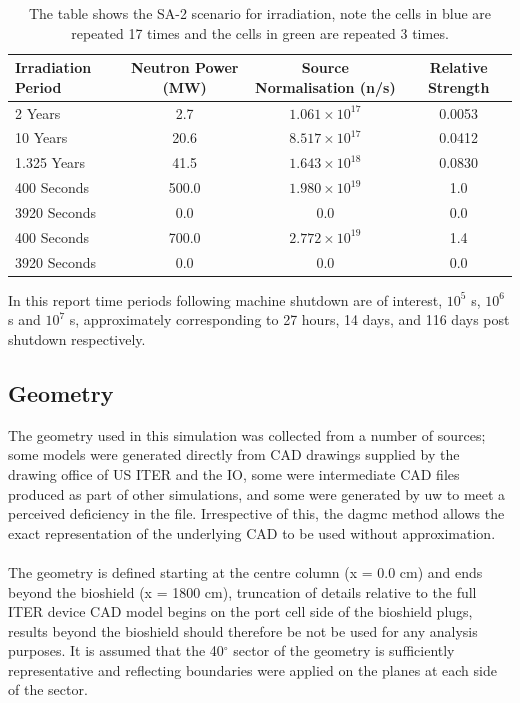 \documentclass[12pt]{article}
\begin{document}
\begin{table}[ht!]
   \begin{tabular}{| l | c | c | c |}
      \hline 
      Irradiation Period & Neutron Power (MW) & Source Normalisation (n/s) &  Relative Strength \\
      \hline
      2 Years & 2.7 & $1.061\times10^{17}$ & 0.0053 \\
      10 Years & 20.6 & $8.517\times10^{17}$ & 0.0412 \\
      1.325 Years & 41.5 & $1.643\times10^{18}$ & 0.0830 \\
      \cellcolor{blue!25} \cellcolor{blue!25} 400 Seconds & \cellcolor{blue!25} 500.0 & $1.980\times10^{19}$ & \cellcolor{blue!25} 1.0  \\
      \cellcolor{blue!25} 3920 Seconds & \cellcolor{blue!25} 0.0 & \cellcolor{blue!25} 0.0 & \cellcolor{blue!25} 0.0 \\
      \cellcolor{green!25} 400 Seconds & \cellcolor{green!25} 700.0 & \cellcolor{green!25} $2.772\times10^{19}$ &\cellcolor{green!25} 1.4 \\
      \cellcolor{green!25} 3920 Seconds & \cellcolor{green!25} 0.0 & \cellcolor{green!25} 0.0 &\cellcolor{green!25} 0.0 \\
      \hline
\end{tabular}
\caption{The table shows the SA-2 scenario for irradiation, note the
         cells in \textcolor{blue!25}{blue} are repeated 17 times
         and the cells in \textcolor{green!25}{green} are repeated 3
         times.}
\label{tab:irrad_scenario}
\end{table}
In this report time periods following machine shutdown are of interest,
$10^5$ s, $10^6$ s and $10^7$ s, approximately corresponding to 27 
hours, 14 days, and 116 days post shutdown respectively.

\subsection{Geometry}
The geometry used in this simulation was collected from a number of sources;
some models were generated directly from CAD drawings supplied by the
drawing office of US ITER and the IO, some were intermediate CAD files produced
as part of other simulations, and some were generated by \gls{uw} to meet a
perceived deficiency in the file. Irrespective of this, the \gls{dagmc} method
allows the exact representation of the underlying CAD to be used without
approximation.
\\
\\
The geometry is defined starting at the centre column (x = 0.0 cm) and ends
beyond the bioshield (x = 1800 cm), truncation of details relative to the full
ITER device CAD model begins on the port cell side of the bioshield plugs,
results beyond the bioshield should therefore be not be used for any
analysis purposes.  It is assumed that the 40$^{\circ}$ sector of the geometry
is sufficiently representative and reflecting boundaries were applied on the
planes at each side of the sector.
\end{document}
